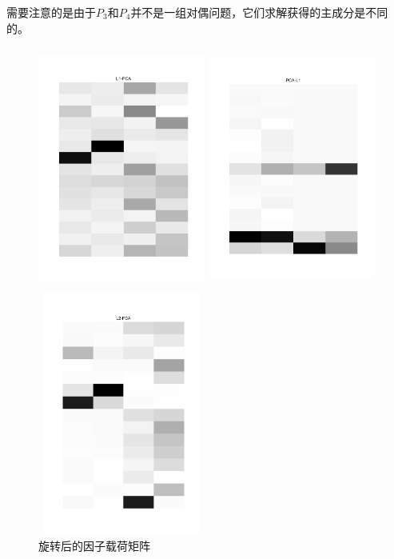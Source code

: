 需要注意的是由于$P_3$和$P_4$并不是一组对偶问题，它们求解获得的主成分是不同的。
\begin{figure}[H]
    \centering
    \begin{minipage}[t]{0.3\textwidth}
    \includegraphics[width=5.5cm,height=8cm]{pics/lab1/l1-pca-rotated.pdf}
    \end{minipage}
    \begin{minipage}[t]{0.3\textwidth}
    \includegraphics[width=5.5cm,height=8cm]{pics/lab1/pca-l1-rotated.pdf}
    \end{minipage}
    \begin{minipage}[t]{0.3\textwidth}
    \includegraphics[width=5.5cm, height=8cm]{pics/lab1/l2-pca-rotated.pdf}
    \end{minipage}
    \caption{旋转后的因子载荷矩阵}
    \label{compare-rotate}
\end{figure}

